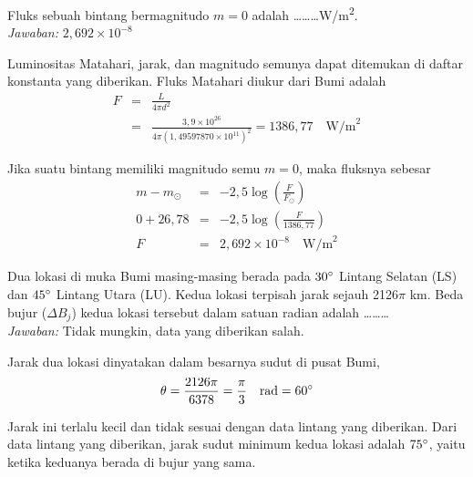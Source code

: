 \documentclass[11pt,fleqn]{exam}
\begin{document}
\begin{questions}
\vspace{0.3cm}
\question Fluks sebuah bintang bermagnitudo $m=0$ adalah \ldots\ldots\ldots W/m\textsuperscript{2}.\\

\textit{Jawaban: } $2,692 \times 10^{-8}$

Luminositas Matahari, jarak, dan magnitudo semunya dapat ditemukan di daftar konstanta yang diberikan. Fluks Matahari diukur dari Bumi adalah
\begin{eqnarray*}
F &=& \frac{L}{4 \pi d^2} \\
  &=& \frac{3,9 \times 10^{26}}{4 \pi (1,49597870 \times 10^{11})^2} = 1386,77 \quad \text{W/m}^{2}
\end{eqnarray*}

Jika suatu bintang memiliki magnitudo semu $m = 0$, maka fluksnya sebesar
\begin{eqnarray*}
m - m_{\odot} &=& -2,5 \log\left(\frac{F}{F_{\odot}}\right)\\
0 + 26,78 &=& -2,5 \log\left(\frac{F}{1386,77}\right)\\
F &=&   2,692 \times 10^{-8} \quad \text{W/m}^{2}
\end{eqnarray*}


\vspace{0.3cm}
\question Dua lokasi di muka Bumi masing-masing berada pada $30\degree$ Lintang Selatan (LS) dan $45\degree$ Lintang Utara (LU). Kedua lokasi terpisah jarak sejauh 2126$\pi$ km. Beda bujur ($\Delta B_j$) kedua lokasi tersebut dalam satuan radian adalah \ldots\ldots\ldots\\

\textit{Jawaban: } Tidak mungkin, data yang diberikan salah.

Jarak dua lokasi dinyatakan dalam besarnya sudut di pusat Bumi,
\begin{equation*}
\theta = \frac{2126 \pi }{6378} = \frac{\pi}{3} \quad \text{rad} = 60\degree
\end{equation*}

Jarak ini terlalu kecil dan tidak sesuai dengan data lintang yang diberikan. Dari data lintang yang diberikan, jarak sudut minimum kedua lokasi adalah $75\degree$, yaitu ketika keduanya berada di bujur yang sama.\\



\end{questions}
\end{document}
